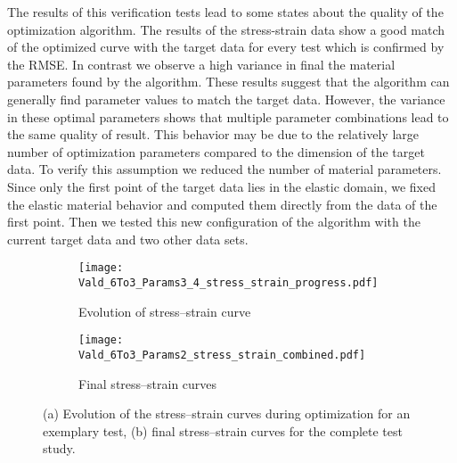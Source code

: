 The results of this verification tests lead to some states about the quality of the optimization algorithm. The results of the stress-strain data show a good match of the optimized curve with the target data for every test which is confirmed by the RMSE. In contrast we observe a high variance in final the material parameters found by the algorithm. These results suggest that the algorithm can generally find parameter values to match the target data. However, the variance in these optimal parameters shows that multiple parameter combinations lead to the same quality of result. This behavior may be due to the relatively large number of optimization parameters compared to the dimension of the target data. To verify this assumption we reduced the number of material parameters. Since only the first point of the target data lies in the elastic domain, we fixed the elastic material behavior and computed them directly from the data of the first point. Then we tested this new configuration of the algorithm with the current target data and two other data sets.



\begin{figure}[H]
\centering

\begin{subfigure}[t]{0.495\textwidth}
    \centering
    \texttt{[image: Vald\_6To3\_Params3\_4\_stress\_strain\_progress.pdf]}
    \caption{Evolution of stress–strain curve}
    \label{fig:verif_progress_stress_strain_curve}
\end{subfigure}
\hfill
\begin{subfigure}[t]{0.495\textwidth}
    \centering
    \texttt{[image: Vald\_6To3\_Params2\_stress\_strain\_combined.pdf]}
    \caption{Final stress–strain curves}
    \label{fig:verif_final_stress_strain_curves}
\end{subfigure}

\caption{%
    (a) Evolution of the stress–strain curves during optimization for an exemplary test,
    (b) final stress–strain curves for the complete test study.%
}
\label{fig:complete}
\end{figure}


